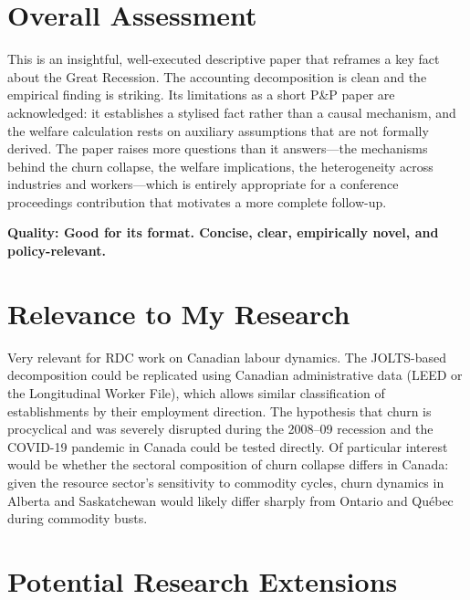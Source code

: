\section{Overall Assessment}

This is an insightful, well-executed descriptive paper that reframes a key
fact about the Great Recession. The accounting decomposition is clean and the
empirical finding is striking. Its limitations as a short P\&P paper are
acknowledged: it establishes a stylised fact rather than a causal mechanism,
and the welfare calculation rests on auxiliary assumptions that are not formally
derived. The paper raises more questions than it answers---the mechanisms
behind the churn collapse, the welfare implications, the heterogeneity across
industries and workers---which is entirely appropriate for a conference
proceedings contribution that motivates a more complete follow-up.

\textbf{Quality: Good for its format. Concise, clear, empirically novel,
and policy-relevant.}

\section{Relevance to My Research}

Very relevant for RDC work on Canadian labour dynamics. The JOLTS-based
decomposition could be replicated using Canadian administrative data (LEED or
the Longitudinal Worker File), which allows similar classification of
establishments by their employment direction. The hypothesis that churn is
procyclical and was severely disrupted during the 2008--09 recession and the
COVID-19 pandemic in Canada could be tested directly. Of particular interest
would be whether the sectoral composition of churn collapse differs in Canada:
given the resource sector's sensitivity to commodity cycles, churn dynamics in
Alberta and Saskatchewan would likely differ sharply from Ontario and
Qu\'{e}bec during commodity busts.

\section{Potential Research Extensions}

